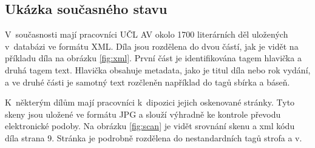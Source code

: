 \documentclass[thesis=B,czech]{FITthesis}[2012/06/26]
\begin{document}
\begin{introduction}
    \section{Ukázka současného stavu}

        V~současnosti mají pracovníci UČL AV okolo 1700 literárních děl uložených v~databázi ve formátu XML. Díla jsou rozdělena do dvou částí, jak je vidět na příkladu díla  na obrázku \ref{fig:xml}. První část je identifikována tagem hlavička a druhá tagem text. Hlavička obsahuje metadata, jako je titul díla nebo rok vydání, a ve druhé části je samotný text rozčleněn například do tagů sbírka a báseň.
        
        K~některým dílům mají pracovníci k~dipozici jejich oskenované stránky. Tyto skeny jsou uložené ve formátu JPG a slouží výhradně ke kontrole převodu elektronické podoby. Na obrázku \ref{fig:scan} je vidět srovnání skenu a xml kódu díla  strana 9. Stránka je podrobně rozdělena do nestandardních tagů strofa a v.
        
\end{introduction}

    


    





\end{document}
